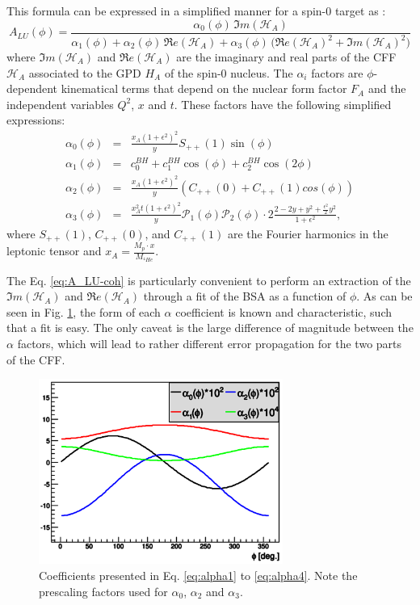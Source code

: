 \documentclass[aps,prc,preprint,superscriptaddress]{revtex4}
\begin{document}
This formula can be expressed in a simplified manner for a spin-0 target as \cite{Belitsky:2008bz}:
\begin{equation}
A_{LU}(\phi) = \frac{\alpha_{0}(\phi) \, \Im m(\mathcal{H}_{A})}
{\alpha_{1}(\phi) + \alpha_{2}(\phi) \, \Re e(\mathcal{H}_{A}) + \alpha_{3}(\phi) \, 
\big( 
\Re e(\mathcal{H}_{A})^{2} + \Im m(\mathcal{H}_{A})^{2} \big)}
\label{eq:A_LU-coh}
\end{equation}
where $\Im m(\mathcal{H}_{A})$ and $\Re e(\mathcal{H}_{A})$ are the imaginary 
and real parts of the CFF $\mathcal{H}_{A}$ associated to the GPD $H_A$ of the 
spin-0 nucleus. The 
$\alpha_{i}$ factors are $\phi$-dependent kinematical terms that depend on the 
nuclear form factor $F_A$ and the independent variables $Q^2$, $x$ and $t$.  
These factors have the following simplified expressions:
\begin{eqnarray}
	\label{eq:alpha1}
   \alpha_0 (\phi) & = &\frac{x_{A}(1+\epsilon^2)^2}{y} S_{++}(1) \sin(\phi)\\
    \alpha_1 (\phi) & = & c_0^{BH}+c_1^{BH} \cos({\phi})+c_2^{BH} \cos(2\phi)\\ 
   \alpha_2 (\phi) & = & \frac{x_{A}(1+\epsilon^2)^2}{y}  \left( C_{++}(0) +  
C_{++}(1) cos(\phi) \right)\\
\alpha_3 (\phi) &=& \frac{x^{2}_{A}t(1+\epsilon^2)^2}{y} {\mathcal P}_1(\phi) 
{\mathcal P}_2(\phi) \cdot 2 \frac{2-2y+y^2 + \frac{\epsilon^2}{2}y^2}{1 + 
\epsilon^2},
	\label{eq:alpha4}
\end{eqnarray}
where $S_{++}(1)$, $C_{++}(0)$, and $C_{++}(1)$ are the Fourier harmonics in the 
leptonic tensor \cite{Belitsky:2008bz} and $x_{A} = \frac{M_{p}\cdot x}{M_{^4\!He}}$. 

The Eq. \ref{eq:A_LU-coh} is particularly convenient to perform an extraction of 
the $\Im m(\mathcal{H}_{A})$ and $\Re e(\mathcal{H}_{A})$ through a fit of the BSA as 
a function of $\phi$. As can be seen in Fig. \ref{fig:alphas}, the form of each 
$\alpha$ coefficient is known and characteristic, such that a fit is easy. The only caveat
is the large difference of magnitude between the $\alpha$ factors, which will lead to 
rather different error propagation for the two parts of the CFF.

\begin{figure}[tbp!]
\center
\includegraphics[width=8cm]{fig3/AlphaCoefs.png}
	\caption{Coefficients presented in Eq. \ref{eq:alpha1} to \ref{eq:alpha4}.
	Note the prescaling factors used for $\alpha_0$, $\alpha_2$ and $\alpha_3$.}
\label{fig:alphas}
\end{figure}
\end{document}
